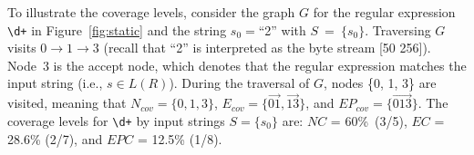 



To illustrate the coverage levels, consider the graph $G$ for the regular expression \verb!\d+! in Figure~\ref{fig:static} and the string $s_0 = $``2'' with $S~=~\{s_0\}$. 
Traversing $G$ visits $0 \rightarrow 1 \rightarrow 3$ (recall that ``2'' is interpreted as the byte stream [50 256]). Node~$3$ is the accept node, which denotes that the regular expression matches the input string (i.e., $s \in L(R)$). 
During the traversal of $G$, nodes \{0, 1, 3\} are visited, meaning that $N_{cov} = \{0, 1, 3\}$, $E_{cov} = \{\overrightarrow{01}, \overrightarrow{13}\}$, and $EP_{cov} = \{\overrightarrow{013}\}$. 
The coverage levels for \verb!\d+! by input strings $S = \{s_0\}$ are: $NC$ = 60\%~(3/5), $EC$ =  28.6\% (2/7), and $EPC$ =  12.5\% (1/8).%



